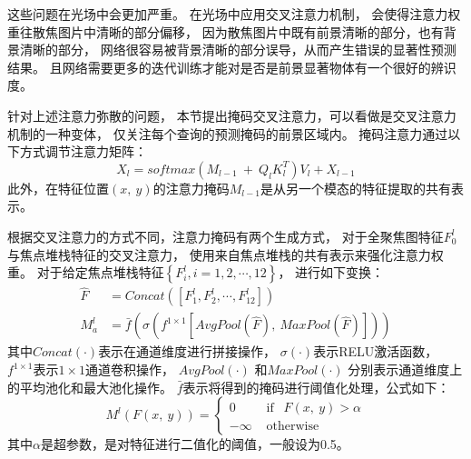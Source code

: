 这些问题在光场中会更加严重。
在光场中应用交叉注意力机制，
会使得注意力权重往散焦图片中清晰的部分偏移，
因为散焦图片中既有前景清晰的部分，也有背景清晰的部分，
网络很容易被背景清晰的部分误导，从而产生错误的显著性预测结果。
且网络需要更多的迭代训练才能对是否是前景显著物体有一个很好的辨识度。
%
%
%
%
%
\par
%
%
%
%
针对上述注意力弥散的问题，
本节提出掩码交叉注意力，可以看做是交叉注意力机制的一种变体，
仅关注每个查询的预测掩码的前景区域内。
% 
% 
% 
% 
掩码注意力通过以下方式调节注意力矩阵：
\begin{equation}
	X_{l}=softmax(M_{l-1} ~+~Q_{l}K_{l}^{T})V_{l} + X_{l-1}
\end{equation}
% 
% 
此外，在特征位置$(x,~y)$的注意力掩码$M_{l-1}$是从另一个模态的特征提取的共有表示。
%
%
%
%
%
%
\par 
%
%
%
%
根据交叉注意力的方式不同，注意力掩码有两个生成方式，
对于全聚焦图特征$F_{0}^{l}$与焦点堆栈特征的交叉注意力，
使用来自焦点堆栈的共有表示来强化注意力权重。
对于给定焦点堆栈特征$\left \{ F_{i}^{l}, i=1,2,\cdots, 12 \right \}$，
进行如下变换：
%
%
%
%
\begin{equation}
\begin{aligned}
	\hat{F} &= Concat(\left [  F_{1}^{l}, F_{2}^{l}, \cdots, F_{12}^{l} \right ] ) \\
	M_{a}^{l} &= \bar{f}
	\left (  \sigma \left ( f^{1 \times 1}\left [  
	AvgPool\left ( \hat{F} \right ) ,~ MaxPool\left ( \hat{F} \right ) 
	\right ]  \right )  \right )
\end{aligned}
\end{equation}
%
%
%
其中$Concat(\cdot)$表示在通道维度进行拼接操作，
$\sigma(\cdot)$表示RELU激活函数，
$f^{1\times 1}$表示$1\times 1$通道卷积操作，
$AvgPool(\cdot)$
和$MaxPool(\cdot)$
分别表示通道维度上的平均池化和最大池化操作。
$\bar{f}$表示将得到的掩码进行阈值化处理，公式如下：
%
%
%
%
%
%
%
\begin{equation}
M^{l}\left ( F\left ( x, ~y \right )  \right ) =
\begin{cases}
	0  & \text{ if } ~~ F(x,~y)>  \alpha \\
	-\infty & \text{ otherwise } 
\end{cases}
\end{equation}
%
%
%
其中$\alpha$是超参数，是对特征进行二值化的阈值，一般设为0.5。












